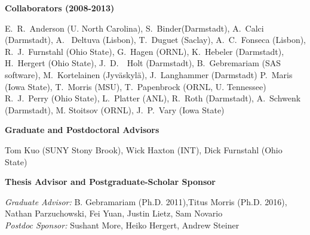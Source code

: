 \noindent
{\bf Collaborators (2008-2013)}

E.~R.\ Anderson (U. North Carolina),
S.~Binder(Darmstadt),
A.~Calci (Darmstadt),
A.~ Deltuva (Lisbon),
T.~Duguet (Saclay),
A.~C.\ Fonseca (Lisbon),
R.~J.\ Furnstahl (Ohio State),
G.~Hagen (ORNL),
K.~Hebeler (Darmstadt),
H.~Hergert (Ohio State),
J.~D.~\ Holt (Darmstadt),
B.~Gebremariam (SAS software),
M.~Kortelainen (Jyv\"askyl\"a),
J.~Langhammer (Darmstadt)
P.~Maris (Iowa State),
T.~Morris (MSU),
T.~Papenbrock (ORNL, U. Tennessee)
R.~J.\ Perry (Ohio State),
L.~Platter (ANL),
R.~Roth (Darmstadt),
A.~Schwenk (Darmstadt),
M. Stoitsov (ORNL),
J.~P.\ Vary (Iowa State)

\medskip

\noindent
{\bf
Graduate and Postdoctoral Advisors}

Tom Kuo (SUNY Stony Brook), Wick Haxton (INT),
Dick Furnstahl (Ohio State)


\medskip

\noindent
{\bf
Thesis Advisor and Postgraduate-Scholar Sponsor}

\noindent
{\it Graduate Advisor:}
B. Gebramariam (Ph.D. 2011),Titus Morris (Ph.D. 2016), Nathan Parzuchowski, Fei Yuan, Justin Lietz, Sam Novario\\ 
\noindent                
{\it Postdoc Sponsor:}
Sushant More, Heiko Hergert,
Andrew Steiner\\





